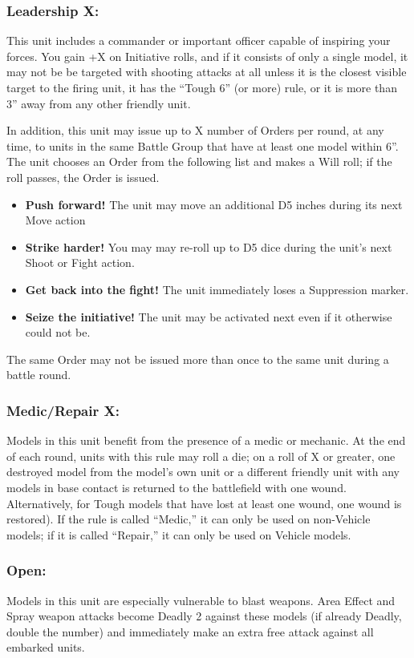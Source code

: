 \begin{multicols}{2}
\subsubsection*{Leadership X:} This unit includes a commander or important officer capable of inspiring your forces. You gain +X on Initiative rolls, and if it consists of only a single model, it may not be be targeted with shooting attacks at all unless it is the closest visible target to the firing unit, it has the ``Tough 6'' (or more) rule, or it is more than 3'' away from any other friendly unit.

In addition, this unit may issue up to X number of Orders per round, at any time, to units in the same Battle Group that have at least one model within 6''. The unit chooses an Order from the following list and makes a Will roll; if the roll passes, the Order is issued.

\begin{itemize}
    \item \textbf{Push forward!} The unit may move an additional D5 inches during its next Move action
    \item \textbf{Strike harder!} You may may re-roll up to D5 dice during the unit's next Shoot or Fight action.
    \item \textbf{Get back into the fight!} The unit immediately loses a Suppression marker.
    \item \textbf{Seize the initiative!} The unit may be activated next even if it otherwise could not be.
\end{itemize}

The same Order may not be issued more than once to the same unit during a battle round.

\subsubsection*{Medic/Repair X:} Models in this unit benefit from the presence of a medic or mechanic. At the end of each round, units with this rule may roll a die; on a roll of X or greater, one destroyed model from the model's own unit or a different friendly unit with any models in base contact is returned to the battlefield with one wound. Alternatively, for Tough models that have lost at least one wound, one wound is restored). If the rule is called ``Medic,'' it can only be used on non-Vehicle models; if it is called ``Repair,'' it can only be used on Vehicle models.

\subsubsection*{Open:} Models in this unit are especially vulnerable to blast weapons. Area Effect and Spray weapon attacks become Deadly 2 against these models (if already Deadly, double the number) and immediately make an extra free attack against all embarked units.


\end{multicols}
